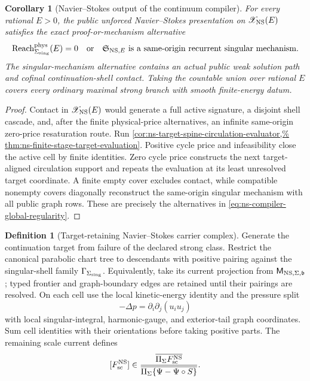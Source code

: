 \documentclass[11pt]{article}
\numberwithin{section}{part}
\theoremstyle{plain}
\newtheorem{corollary}[corollary]{Corollary}
\theoremstyle{definition}
\newtheorem{definition}[definition]{Definition}
\theoremstyle{remark}
\newcommand{\Reach}{\operatorname{Reach}}
\newcommand{\Phys}{\mathrm{phys}}
\begin{document}
\begin{corollary}[Navier--Stokes output of the continuum compiler]
\label{cor:ns-continuum-compiler-closure}
For every rational \(E>0\), the public unforced Navier--Stokes presentation on
\(\mathscr X_{\rm NS}(E)\) satisfies the exact proof-or-mechanism alternative
\begin{equation}
 \label{eq:ns-compiler-global-regularity}
 \Reach_{\Sigma_{\rm sing}}^{\Phys}(E)=0
 \quad\text{or}\quad
 \mathfrak S_{{\rm NS},E}\text{ is a same-origin recurrent singular mechanism}.
\end{equation}
The singular-mechanism alternative contains an actual public weak solution
path and cofinal continuation-shell contact.  Taking the countable union over
rational \(E\) covers every ordinary maximal strong branch with smooth
finite-energy datum.
\end{corollary}

\begin{proof}
Contact in \(\mathscr X_{\rm NS}(E)\) would generate a full active signature, a disjoint shell cascade,
and, after the finite physical-price alternatives, an infinite same-origin
zero-price resaturation route.  Run
\cref{cor:ns-target-spine-circulation-evaluator,%
thm:ns-finite-stage-target-evaluation}.  Positive cycle price and
infeasibility close the active cell by finite identities.  Zero cycle price
constructs the next target-aligned circulation support and repeats the
evaluation at its least unresolved target coordinate.  A finite empty cover
excludes contact, while compatible nonempty covers diagonally reconstruct the
same-origin singular mechanism with all public graph rows.  These are precisely the alternatives in
\eqref{eq:ns-compiler-global-regularity}.
\end{proof}

\begin{definition}[Target-retaining Navier--Stokes carrier complex]
\label{def:ns-target-carrier-complex}
Generate the continuation target from failure of the declared strong class.
Restrict the canonical parabolic chart tree to descendants with positive
pairing against the singular-shell family \(\Gamma_{\Sigma_{\rm sing}}\).
Equivalently, take its current projection from
\(\mathsf M_{{\rm NS},\Sigma,\mathfrak b}\); typed frontier and graph-boundary
edges are retained until their pairings are resolved.
On each cell use the local kinetic-energy identity and the pressure split
\[
 -\Delta p=\partial_i\partial_j(u_i u_j)
\]
with local singular-integral, harmonic-gauge, and exterior-tail graph
coordinates.  Sum cell identities with their orientations before taking
positive parts.  The remaining scale current defines
\[
 [F_{\rm sc}^{\rm NS}]
 \in
 \frac{\overline{\Pi_\Sigma F_{\rm sc}^{\rm NS}}}
 {\overline{\Pi_\Sigma\{\Psi-\Psi\circ S\}}}.
\]
\end{definition}
\end{document}

